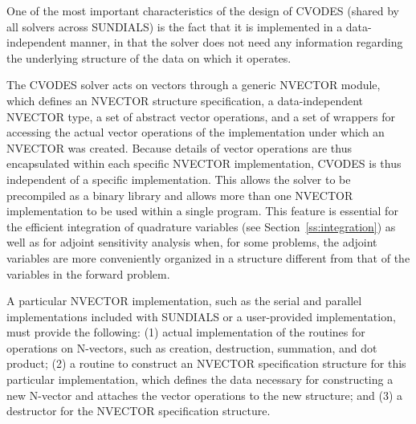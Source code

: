 One of the most important characteristics of the design of CVODES 
(shared by all solvers across SUNDIALS) is the fact that it is implemented 
in a data-independent manner, in that the solver does not need any information
regarding the underlying structure of the data on which it operates.

The CVODES solver acts on vectors through a generic NVECTOR module,
which defines an NVECTOR structure specification, a data-independent
NVECTOR type, a set of abstract vector operations, and a set of
wrappers for accessing the actual vector operations of the
implementation under which an NVECTOR was created. Because details of
vector operations are thus encapsulated within each specific NVECTOR
implementation, CVODES is thus independent of a specific
implementation. This allows the solver to be precompiled as a binary
library and allows more than one NVECTOR implementation to be used
within a single program. This feature is essential for the efficient
integration of quadrature variables (see Section~\ref{ss:integration})
as well as for adjoint sensitivity analysis when, for some problems,
the adjoint variables are more conveniently organized in a structure
different from that of the variables in the forward problem.

A particular NVECTOR implementation, such as the serial and parallel 
implementations included with SUNDIALS or a user-provided implementation,
must provide the following:
(1) actual implementation of the routines for operations on N-vectors, 
such as creation, destruction, summation, and dot product;
(2) a routine to construct an NVECTOR specification structure
for this particular implementation, which defines the data necessary
for constructing a new N-vector and attaches the vector operations
to the new structure; and
(3) a destructor for the NVECTOR specification structure.

